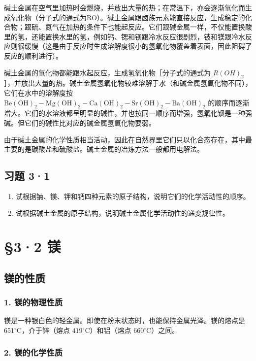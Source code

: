 碱土金属在空气里加热时会燃烧，并放出大量的热；在常温下，亦会逐渐氧化而生成氧化物（分子式的通式为RO）。碱土金属跟卤族元素能直接反应，生成稳定的化合物；跟硫、氮气在加热的条件下也能起反应。它们跟碱金属一样，不仅能置换酸里的氢，还能置换水里的氢，例如钙、锶和钡跟冷水反应很剧烈，铍和镁跟冷水反应则很缓慢（这是由于反应时生成溶解度很小的氢氧化物覆盖着表面，因此阻碍了反应的顺利进行）。

碱土金属的氧化物都能跟水起反应，生成氢氧化物［分子式的通式为
\(R(OH)_{2}\)
］，并放出大量的热。碱土金属氢氧化物较难溶解于水（和碱金属氢氧化物不同），它们在水中的溶解度按
\(\mathrm{Be(OH)}_{2}-\mathrm{Mg(OH)}_{2}-\mathrm{Ca(OH)}_{2}-\mathrm{Sr(OH)}_{2}-\mathrm{Ba(OH)}_{2}\)
的顺序而逐渐增大。它们的水溶液都呈明显的碱性，并也按同一顺序而增强，氢氧化钡是一种强碱。但它们的碱性比对应的碱金属氢氧化物要弱。

由于碱土金属的化学性质相当活动，因此在自然界里它们只以化合态存在，其中最主要的是碳酸盐和硫酸盐。碱土金属的冶炼方法一般都用电解法。

\subsection{习题 3·1}

\begin{enumerate}
\item
  试根据钠、镁、钾和钙四种元素的原子结构，说明它们的化学活动性的顺序。
\item
  试根据碱土金属的原子结构，说明碱土金属化学活动性的递变规律性。
\end{enumerate}

\section{§3·2 镁}

\subsection{镁的性质}

\subsubsection{1. 镁的物理性质}

镁是一种银白色的轻金属。即使在粉末状态时，也能保持金属光泽。镁的熔点是
\(651^{\circ} \mathrm{C}\)，介于锌（熔点
\(419^{\circ} \mathrm{C}\)）和铝（熔点
\(660^{\circ} \mathrm{C}\)）之间。

\subsubsection{2. 镁的化学性质}


